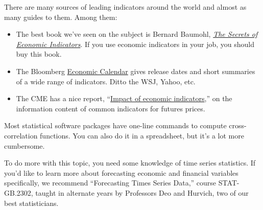 There are many sources of leading indicators around the world
and almost as many guides to them.
Among them:
%
\begin{itemize}

\item The best book we've seen on the subject is
Bernard Baumohl,
\href{http://www.amazon.com/The-Secrets-Economic-Indicators-Opportunities/dp/0132932075/}
{\it The Secrets of Economic Indicators\/}.
If you use economic indicators in your job, you should buy this book.

\item The Bloomberg
\href{http://www.bloomberg.com/markets/ecalendar/index.html}
{Economic Calendar}
gives release dates and short summaries of a wide range of indicators.
Ditto the WSJ, Yahoo, etc.


\item The CME has a nice report,
``\href{http://www.cmegroup.com/education/featured-reports/impact-of-economic-indicators.html}
{Impact of economic indicators},''
on the information content of common indicators for futures prices.


\end{itemize}
%
Most statistical software packages have one-line commands to compute
cross-correlation functions.
You can also do it in a spreadsheet, but it's a lot more cumbersome.

To do more with this topic, you need some knowledge of time series statistics.
If you'd like to learn more about forecasting economic and
financial variables specifically,
we recommend ``Forecasting Times Series Data,'' course STAT-GB.2302,
taught in alternate years by Professors Deo and Hurvich, two of our best statisticians.

